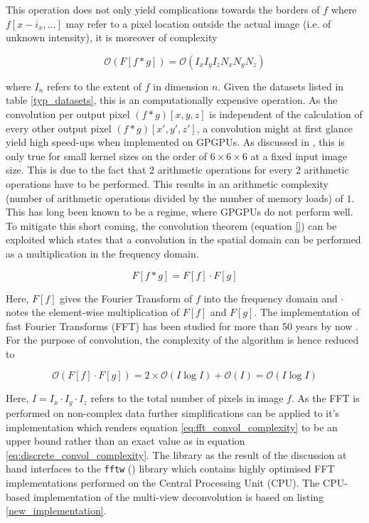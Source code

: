 This operation does not only yield complications towards the borders of $f$ where $f[x-i_x,\dots]$ may refer to a pixel location outside the actual image (i.e. of unknown intensity), it is moreover of complexity 

\begin{equation}
\label{eq:discrete_convol_complexity}
\mathcal{O}(F[f \ast g]) = \mathcal{O}(I_{x} I_{y} I_{z} N_{x} N_{y} N_{z})
\end{equation}


where $I_{n}$ refers to the extent of $f$ in dimension $n$. Given the datasets listed in table \ref{typ_datasets}, this is an computationally expensive operation. As the convolution per output pixel $(f \ast g)[x,y,z]$ is independent of the calculation of every other output pixel $(f \ast g)[x',y',z']$, a convolution might at first glance yield high speed-ups when implemented on GPGPUs. As discussed in \cite{eklund_nonseparable_filtering}, this is only true for small kernel sizes on the order of $6 \times 6 \times 6$ at a fixed input image size. This is due to the fact that 2 arithmetic operations for every 2 arithmetic operations have to be performed. This results in an arithmetic complexity (number of arithmetic operations divided by the number of memory loads) of $1$. This has long been known \cite{massively_parallel_book} to be a regime, where GPGPUs do not perform well. To mitigate this short coming, the convolution theorem (equation \ref{}) can be exploited which states that a convolution in the spatial domain can be performed as a multiplication in the frequency domain.

\begin{equation}
  \label{eq:convol_theorem}
  F[f \ast g] = F[f] \cdot F[g]
\end{equation}

Here, $F[f]$ gives the Fourier Transform of $f$ into the frequency domain and $\cdot$ notes the element-wise multiplication of $F[f]$ and $F[g]$. The implementation of fast Fourier Transforms (FFT) has been studied for more than 50 years by now \cite{FFTCooleyTurkey,FFTBluestein,FFTRaders}. For the purpose of convolution, the complexity of the algorithm is hence reduced to 

\begin{equation}
  \label{eq:fft_convol_complexity}
  \mathcal{O}(F[f] \cdot F[g]) = 2\times\mathcal{O}(I\log I) + \mathcal{O}(I) = \mathcal{O}(I\log I)
\end{equation}

Here, $I = I_{x} \cdot I_{y} \cdot I_{z}$ refers to the total number of pixels in image $f$. As the FFT is performed on non-complex data further simplifications can be applied to it's implementation which renders equation \ref{eq:fft_convol_complexity} to be an upper bound rather than an exact value as in equation \ref{eq:discrete_convol_complexity}. The library as the result of the discussion at hand interfaces to the \texttt{fftw} (\cite{FFTW05}) library which contains highly optimised FFT implementations performed on the Central Processing Unit (CPU). The CPU-based implementation of the multi-view deconvolution is based on listing \ref{new_implementation}.

